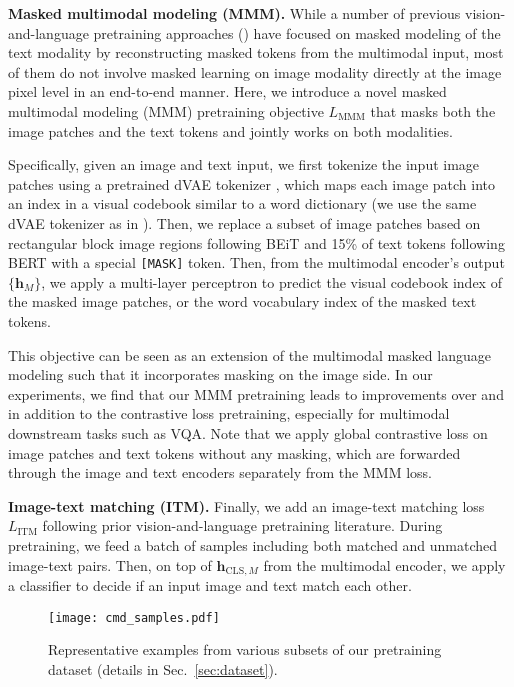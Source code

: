 \documentclass[10pt,twocolumn,letterpaper]{article}
\newcommand{\myparagraph}[1]{\vspace{0.25em}\noindent\textbf{#1}}
\begin{document}
\myparagraph{Masked multimodal modeling (MMM).} While a number of previous vision-and-language pretraining approaches (\eg \cite{li2019visualbert}) have focused on masked modeling of the text modality by reconstructing masked tokens from the multimodal input, most of them do not involve masked learning on image modality directly at the image pixel level in an end-to-end manner. Here, we introduce a novel masked multimodal modeling (MMM) pretraining objective $L_{\mathrm{MMM}}$ that masks both the image patches and the text tokens and jointly works on both modalities.

Specifically, given an image and text input, we first tokenize the input image patches using a pretrained dVAE tokenizer \cite{dalle}, which maps each image patch into an index in a visual codebook similar to a word dictionary (we use the same dVAE tokenizer as in \cite{bao2021beit}). Then, we replace a subset of image patches based on rectangular block image regions following BEiT \cite{bao2021beit} and 15\% of text tokens following BERT \cite{devlin2018bert} with a special \texttt{[MASK]} token. Then, from the multimodal encoder's output $\{\mathbf{h}_M\}$, we apply a multi-layer perceptron to predict the visual codebook index of the masked image patches, or the word vocabulary index of the masked text tokens.

This objective can be seen as an extension of the multimodal masked language modeling such that it incorporates masking on the image side. In our experiments, we find that our MMM pretraining leads to improvements over and in addition to the contrastive loss pretraining, especially for multimodal downstream tasks such as VQA. Note that we apply global contrastive loss on image patches and text tokens without any masking, which are forwarded through the image and text encoders separately from the MMM loss.

\myparagraph{Image-text matching (ITM).} Finally, we add an image-text matching loss $L_{\mathrm{ITM}}$ following prior vision-and-language pretraining literature\cite{lu2019vilbert,tan2019LXMERTLC,chen2020uniter}. During pretraining, we feed a batch of samples including both matched and unmatched image-text pairs. Then, on top of $\mathbf{h}_{\mathrm{CLS},M}$ from the multimodal encoder, we apply a classifier to decide if an input image and text match each other.

\begin{figure*}[t]
\vspace{-1.5em}
\centering
\texttt{[image: cmd\_samples.pdf]}
\vspace{-0.9em}
\caption{Representative examples from various subsets of our pretraining dataset (details in Sec.~\ref{sec:dataset}).}
\label{fig:cmd}
\vspace{-1em}
\end{figure*}
\end{document}
